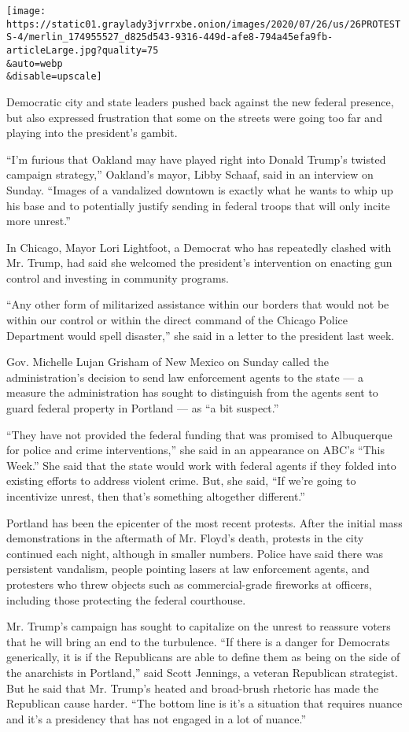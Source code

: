 \texttt{[image: https://static01.graylady3jvrrxbe.onion/images/2020/07/26/us/26PROTESTS-4/merlin\_174955527\_d825d543-9316-449d-afe8-794a45efa9fb-articleLarge.jpg?quality=75\\\&auto=webp\\\&disable=upscale]}

Democratic city and state leaders pushed back against the new federal
presence, but also expressed frustration that some on the streets were
going too far and playing into the president's gambit.

``I'm furious that Oakland may have played right into Donald Trump's
twisted campaign strategy,'' Oakland's mayor, Libby Schaaf, said in an
interview on Sunday. ``Images of a vandalized downtown is exactly what
he wants to whip up his base and to potentially justify sending in
federal troops that will only incite more unrest.''

In Chicago, Mayor Lori Lightfoot, a Democrat who has repeatedly clashed
with Mr. Trump, had said she welcomed the president's intervention on
enacting gun control and investing in community programs.

``Any other form of militarized assistance within our borders that would
not be within our control or within the direct command of the Chicago
Police Department would spell disaster,'' she said in a letter to the
president last week.

Gov. Michelle Lujan Grisham of New Mexico on Sunday called the
administration's decision to send law enforcement agents to the state
--- a measure the administration has sought to distinguish from the
agents sent to guard federal property in Portland --- as ``a bit
suspect.''

``They have not provided the federal funding that was promised to
Albuquerque for police and crime interventions,'' she said in an
appearance on ABC's ``This Week.'' She said that the state would work
with federal agents if they folded into existing efforts to address
violent crime. But, she said, ``If we're going to incentivize unrest,
then that's something altogether different.''

Portland has been the epicenter of the most recent protests. After the
initial mass demonstrations in the aftermath of Mr. Floyd's death,
protests in the city continued each night, although in smaller numbers.
Police have said there was persistent vandalism, people pointing lasers
at law enforcement agents, and protesters who threw objects such as
commercial-grade fireworks at officers, including those protecting the
federal courthouse.

Mr. Trump's campaign has sought to capitalize on the unrest to reassure
voters that he will bring an end to the turbulence. ``If there is a
danger for Democrats generically, it is if the Republicans are able to
define them as being on the side of the anarchists in Portland,'' said
Scott Jennings, a veteran Republican strategist. But he said that Mr.
Trump's heated and broad-brush rhetoric has made the Republican cause
harder. ``The bottom line is it's a situation that requires nuance and
it's a presidency that has not engaged in a lot of nuance.''

